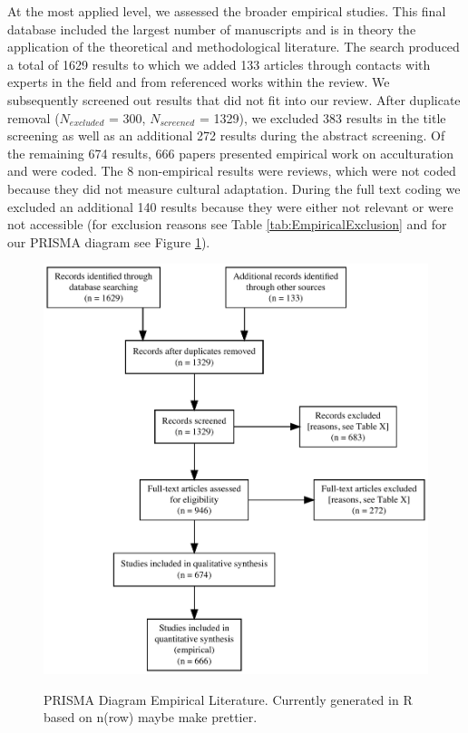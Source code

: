 At the most applied level, we assessed the broader empirical studies.
This final database included the largest number of manuscripts and is in
theory the application of the theoretical and methodological literature.
The search produced a total of 1629 results to which we added 133
articles through contacts with experts in the field and from referenced
works within the review. We subsequently screened out results that did
not fit into our review. After duplicate removal (\(N_{excluded}\) =
300, \(N_{screened}\) = 1329), we excluded 383 results in the title
screening as well as an additional 272 results during the abstract
screening. Of the remaining 674 results, 666 papers presented empirical
work on acculturation and were coded. The 8 non-empirical results were
reviews, which were not coded because they did not measure cultural
adaptation. During the full text coding we excluded an additional 140
results because they were either not relevant or were not accessible
(for exclusion reasons see Table \ref{tab:EmpiricalExclusion} and for
our PRISMA diagram see Figure \ref{fig:PRISMA}).

\begin{figure}[h]
\centering
\caption{PRISMA Diagram Empirical Literature. Currently generated in R based on n(row) maybe make prettier.}
\includegraphics[width=\textwidth]{Figures/PRISMA}
\label{fig:PRISMA}
\end{figure}

